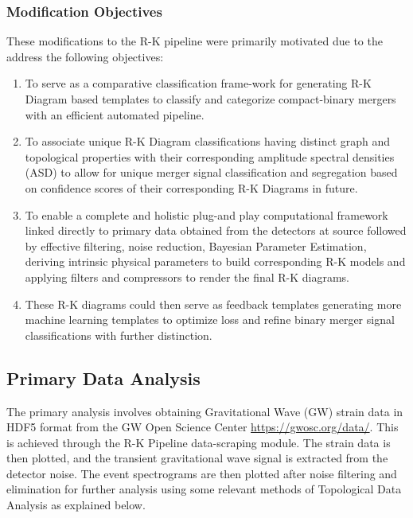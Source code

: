    \subsubsection{Modification Objectives}
    These modifications to the R-K pipeline were primarily motivated due to the address the following objectives:
    \begin{enumerate}
        \item To serve as a comparative classification frame-work for generating R-K Diagram based templates to classify and categorize compact-binary mergers with an efficient automated pipeline.
        \item To associate unique R-K Diagram classifications having distinct graph and topological properties with their  corresponding amplitude spectral densities (ASD) to allow for unique merger signal classification and segregation based on confidence scores of their corresponding R-K Diagrams in future.
        \item To enable a complete and holistic plug-and play computational framework linked directly to  primary data obtained from the detectors at source followed by effective filtering, noise reduction, Bayesian Parameter Estimation, deriving intrinsic physical parameters to build corresponding R-K models and applying filters and compressors to render the final R-K diagrams.
        \item These R-K diagrams could then serve as feedback templates generating more machine learning templates to optimize loss and refine binary merger signal classifications with further distinction.
    \end{enumerate}

    \subsection{Primary Data Analysis}

The primary analysis involves obtaining Gravitational Wave (GW) strain data in HDF5 format from the GW Open Science Center \hyperlink{website}{https://gwosc.org/data/}. This is achieved through the R-K Pipeline data-scraping module. The strain data is then plotted, and the transient gravitational wave signal is extracted from the detector noise. The event spectrograms are then plotted after noise filtering and elimination for further analysis using some relevant methods of Topological Data Analysis as explained below. \cite{00_LIGOOpenSciData} \cite{02.4_TDAResearch} \cite{02_carlsson2009topology}

